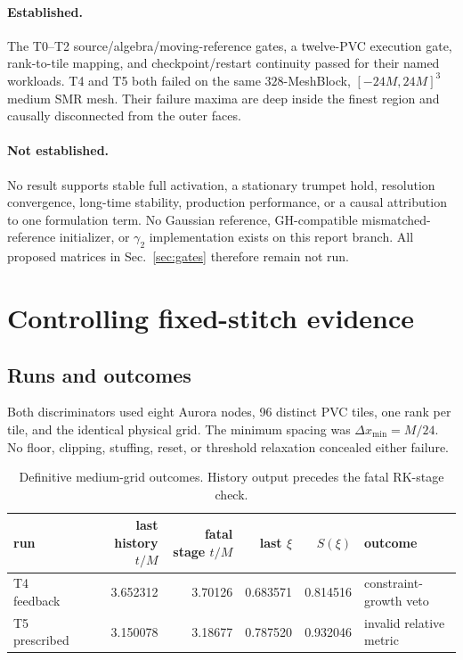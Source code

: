 \documentclass[11pt]{article}
\newcommand{\notrun}{\textcolor{red!65!black}{not run}}
\begin{document}
\paragraph{Established.}
The T0--T2 source/algebra/moving-reference gates, a twelve-PVC execution gate,
rank-to-tile mapping, and checkpoint/restart continuity passed for their named
workloads.  T4 and T5 both failed on the same $328$-MeshBlock,
$[-24M,24M]^3$ medium SMR mesh.  Their failure maxima are deep inside the
finest region and causally disconnected from the outer faces.

\paragraph{Not established.}
No result supports stable full activation, a stationary trumpet hold,
resolution convergence, long-time stability, production performance, or a
causal attribution to one formulation term.  No Gaussian reference,
GH-compatible mismatched-reference initializer, or $\gamma_2$ implementation
exists on this report branch.  All proposed matrices in Sec.~\ref{sec:gates}
therefore remain \notrun.

\section{Controlling fixed-stitch evidence}

\subsection{Runs and outcomes}

Both discriminators used eight Aurora nodes, 96 distinct PVC tiles, one rank
per tile, and the identical physical grid.  The minimum spacing was
$\Delta x_{\min}=M/24$.  No floor, clipping, stuffing, reset, or threshold
relaxation concealed either failure.

\begin{table}[h]
\centering
\caption{Definitive medium-grid outcomes.  History output precedes the fatal
RK-stage check.}
\begin{tabular}{lrrrrl}
\toprule
run & last history $t/M$ & fatal stage $t/M$ & last $\xi$ & $S(\xi)$ & outcome \\
\midrule
T4 feedback & 3.652312 & 3.70126 & 0.683571 & 0.814516 & constraint-growth veto \\
T5 prescribed & 3.150078 & 3.18677 & 0.787520 & 0.932046 & invalid relative metric \\
\bottomrule
\end{tabular}
\end{table}
\end{document}
